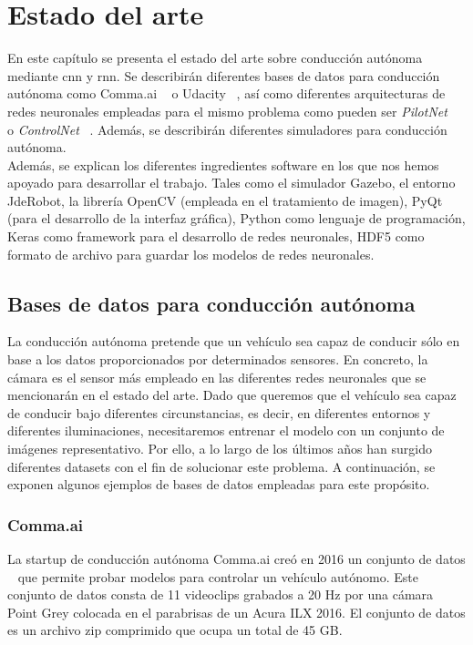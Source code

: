 \chapter{Estado del arte}\label{cap.estado}

En este capítulo se presenta el estado del arte sobre conducción autónoma mediante \acrfull{cnn} y \acrfull{rnn}. Se describirán diferentes bases de datos para conducción autónoma como Comma.ai ~\cite{comma} o Udacity ~\cite{udacity-data}, así como diferentes arquitecturas de redes neuronales empleadas para el mismo problema como pueden ser \textit{PilotNet} ~\cite{explaining-end2end} o \textit{ControlNet} ~\cite{reactive-ground}. Además, se describirán diferentes simuladores para conducción autónoma.\\

Además, se explican los diferentes ingredientes software en los que nos hemos apoyado para desarrollar el trabajo. Tales como el simulador Gazebo, el entorno JdeRobot, la librería OpenCV (empleada en el tratamiento de imagen), PyQt (para el desarrollo de la interfaz gráfica), Python como lenguaje de programación, Keras como framework para el desarrollo de redes neuronales, HDF5 como formato de archivo para guardar los modelos de redes neuronales.\\


\section{Bases de datos para conducción autónoma}

La conducción autónoma pretende que un vehículo sea capaz de conducir sólo en base a los datos proporcionados por determinados sensores. En concreto, la cámara es el sensor más empleado en las diferentes redes neuronales que se mencionarán en el estado del arte. Dado que queremos que el vehículo sea capaz de conducir bajo diferentes circunstancias, es decir, en diferentes entornos y diferentes iluminaciones, necesitaremos entrenar el modelo con un conjunto de imágenes representativo. Por ello, a lo largo de los últimos años han surgido diferentes datasets con el fin de solucionar este problema. A continuación, se exponen algunos ejemplos de bases de datos empleadas para este propósito.

\subsection{Comma.ai}

La startup de conducción autónoma Comma.ai creó en 2016 un conjunto de datos ~\cite{comma} que permite probar modelos para controlar un vehículo autónomo. Este conjunto de datos consta de 11 videoclips grabados a 20 Hz por una cámara Point Grey colocada en el parabrisas de un Acura ILX 2016. El conjunto de datos es un archivo zip comprimido que ocupa un total de 45 GB.\\

